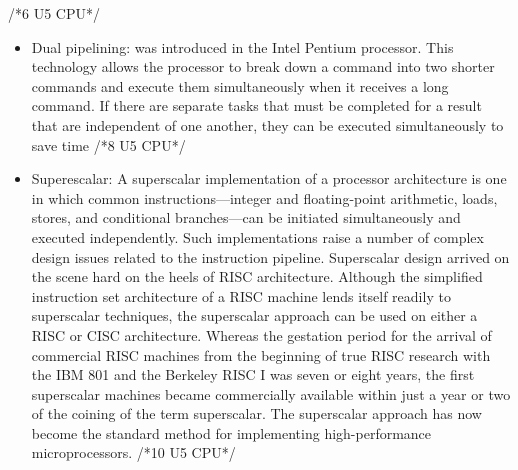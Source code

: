 /*6 U5 CPU*/

\begin{itemize}
\item Dual pipelining:  was introduced in the Intel Pentium processor. This technology allows the processor to break down a command into two shorter commands and execute them simultaneously when it receives a long command. If there are separate tasks that must be completed for a result that are independent of one another, they can be executed simultaneously to save time
/*8 U5 CPU*/
\end{itemize}

\begin{itemize}
\item Superescalar:
A superscalar implementation of a processor architecture is one in which common
instructions—integer and floating-point arithmetic, loads, stores, and conditional
branches—can be initiated simultaneously and executed independently. Such implementations
raise a number of complex design issues related to the instruction pipeline.
Superscalar design arrived on the scene hard on the heels of RISC architecture.
Although the simplified instruction set architecture of a RISC machine lends
itself readily to superscalar techniques, the superscalar approach can be used on
either a RISC or CISC architecture.
Whereas the gestation period for the arrival of commercial RISC machines
from the beginning of true RISC research with the IBM 801 and the Berkeley
RISC I was seven or eight years, the first superscalar machines became commercially
available within just a year or two of the coining of the term superscalar.
The superscalar approach has now become the standard method for implementing
high-performance microprocessors.
/*10 U5 CPU*/
\end{itemize}

